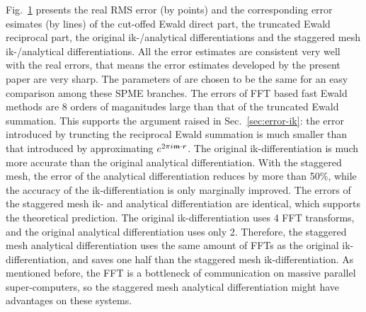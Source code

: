 \documentclass[aps,pre,preprint]{revtex4}
\renewcommand{\v}[1]{\textbf{\textit{#1}}}
\begin{document}
\begin{figure}
  \label{fig:error1}
\end{figure}

Fig.~\ref{fig:error1} presents the real RMS error (by points) and the
corresponding error esimates (by lines) of the cut-offed Ewald direct
part, the truncated Ewald reciprocal part, the original ik-/analytical
differentiations and the staggered mesh ik-/analytical
differentiations. All the error estimates are consistent very well
with the real errors, that means the error estimates developed by the
present paper are very sharp.  The parameters of are
chosen to be the same for an easy comparison among these 
SPME branches.  The errors of FFT
based fast Ewald methods are 8 orders of maganitudes large than that of
the truncated Ewald summation.
This supports the argument raised in
Sec.~\ref{sec:error-ik}: the error introduced by truncting the
reciprocal Ewald summation is much smaller than that introduced by
approximating $e^{2\pi i\v m\cdot\v r}$.
The original ik-differentiation is much more accurate than
the original analytical differentiation.
With the staggered mesh,
the error of the analytical differentiation reduces by more than 50\%,
while the accuracy of the ik-differentiation is only marginally
improved.
The errors of the staggered mesh ik- and analytical differentiation
are identical, which supports the theoretical prediction.
The original ik-differentiation uses 4
FFT transforms, and the original analytical differentiation uses
only 2.  Therefore, the staggered mesh analytical differentiation uses
the same amount of FFTs as the original ik-differentiation, and saves
one half than the staggered mesh ik-differentiation.  As mentioned before,
the FFT is a bottleneck of communication on massive parallel
super-computers, so the staggered mesh analytical differentiation
might have advantages on these systems.
\end{document}
